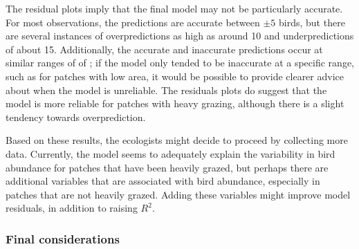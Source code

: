 The residual plots imply that the final model may not be particularly accurate. For most observations, the predictions are accurate between $\pm 5$ birds, but there are several instances of overpredictions as high as around 10 and underpredictions of about 15. Additionally, the accurate and inaccurate predictions occur at similar ranges of of ; if the model only tended to be inaccurate at a specific range, such as for patches with low area, it would be possible to provide clearer advice about when the model is unreliable. The residuals plots do suggest that the model is more reliable for patches with heavy grazing, although there is a slight tendency towards overprediction.

Based on these results, the ecologists might decide to proceed by collecting more data. Currently, the model seems to adequately explain the variability in bird abundance for patches that have been heavily grazed, but perhaps there are additional variables that are associated with bird abundance, especially in patches that are not heavily grazed. Adding these variables might improve model residuals, in addition to raising $R^2$. 

\subsubsection{Final considerations}

